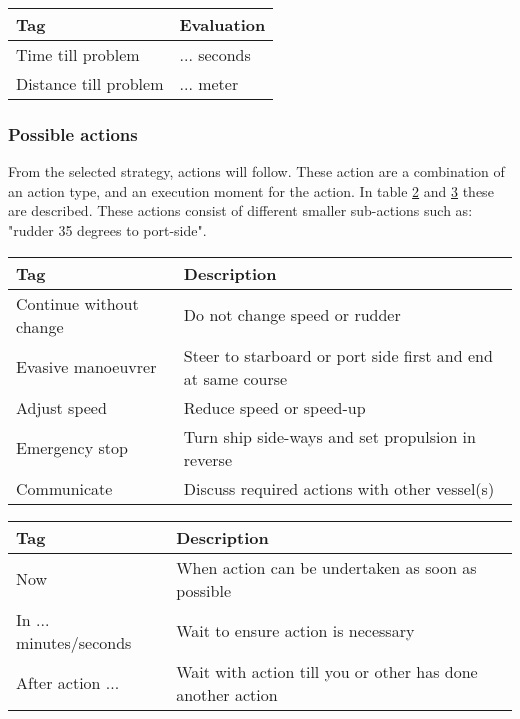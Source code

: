 \begin{table}[H]
	\begin{tabular}{p{}|p{}}
		\toprule
		Tag & Evaluation \\
		\midrule
		Time till problem & ... seconds\\
		Distance till problem & ... meter \\
		\bottomrule
	\end{tabular}
	
	\label{tab:manoeuvre-criteria}
\end{table}

\subsubsection{Possible actions}
From the selected strategy, actions will follow. These action are a combination of an action type, and an execution moment for the action. In table \ref{tab:actions} and \ref{tab:time-domain-action} these are described. These actions consist of different smaller sub-actions such as: "rudder 35 degrees to port-side". 
\begin{table}[H]
	\begin{tabular}{p{}|p{}}
		\toprule
		Tag & Description\\
		\midrule
		Continue without change & Do not change speed or rudder\\
		Evasive manoeuvrer & Steer to starboard or port side first and end at same course\\
		Adjust speed & Reduce speed or speed-up \\
		Emergency stop & Turn ship side-ways and set propulsion in reverse\\
		Communicate & Discuss required actions with other vessel(s)\\
		\bottomrule
	\end{tabular}
	
	\label{tab:actions}
\end{table}

\begin{table}[H]
	\begin{tabular}{p{}|p{}}
		\toprule
		Tag & Description\\
		\midrule
		Now & When action can be undertaken as soon as possible \\
		In ... minutes/seconds & Wait to ensure action is necessary \\
		After action ... & Wait with action till you or other has done another action \\
		\bottomrule
	\end{tabular}
	
	\label{tab:time-domain-action}
\end{table}

